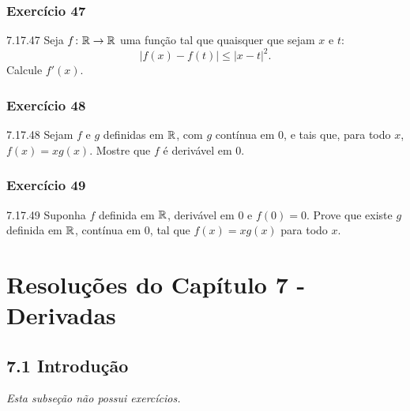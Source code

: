 \subsubsection*{Exercício 47}
\begin{exercicio}[47]{7.17.47}
Seja $f\colon \mathbb{R} \to \mathbb{R}$ uma função tal que quaisquer que sejam $x$ e $t$:
\[
|f(x) - f(t)| \le |x - t|^2.
\]
Calcule $f'(x)$.
\end{exercicio}

\subsubsection*{Exercício 48}
\begin{exercicio}[48]{7.17.48}
Sejam $f$ e $g$ definidas em $\mathbb{R}$, com $g$ contínua em 0, e tais que, para todo $x$, $f(x) = xg(x)$. Mostre que $f$ é derivável em 0.
\end{exercicio}

\subsubsection*{Exercício 49}
\begin{exercicio}[49]{7.17.49}
Suponha $f$ definida em $\mathbb{R}$, derivável em 0 e $f(0) = 0$. Prove que existe $g$ definida em $\mathbb{R}$, contínua em 0, tal que $f(x) = xg(x)$ para todo $x$.
\end{exercicio}


\restaurarsubsub
\clearpage
\section*{Resoluções do Capítulo 7 - Derivadas}

\subsection*{7.1 Introdução}
\textit{Esta subseção não possui exercícios.}

